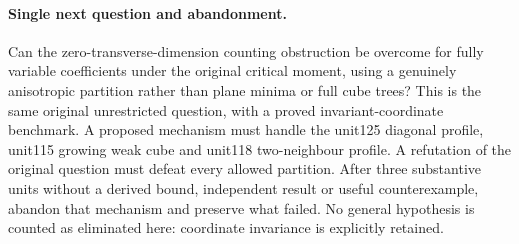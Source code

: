 \documentclass[11pt]{article}
\begin{document}
\paragraph{Single next question and abandonment.}
Can the zero-transverse-dimension counting obstruction be overcome for fully variable coefficients under the original critical moment, using a genuinely anisotropic partition rather than plane minima or full cube trees? This is the same original unrestricted question, with a proved invariant-coordinate benchmark. A proposed mechanism must handle the unit125 diagonal profile, unit115 growing weak cube and unit118 two-neighbour profile. A refutation of the original question must defeat every allowed partition. After three substantive units without a derived bound, independent result or useful counterexample, abandon that mechanism and preserve what failed. No general hypothesis is counted as eliminated here: coordinate invariance is explicitly retained.
\end{document}
